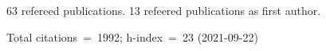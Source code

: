 63 refereed publications. 13 refeered publications as first author.

Total citations~=~1992; h-index~=~23 (2021-09-22)